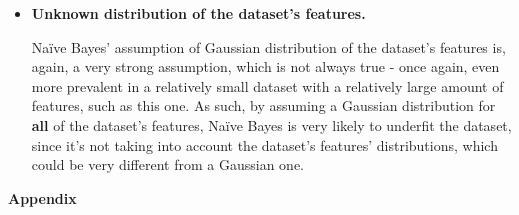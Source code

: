 \documentclass[12pt]{article}
\begin{document}
\begin{enumerate}[leftmargin=\labelsep,resume]
\begin{itemize}
    \item \textbf{Unknown distribution of the dataset's features.}
    
    Naïve Bayes' assumption of Gaussian distribution of the dataset's features
    is, again, a very strong assumption, which is not always true - once again,
    even more prevalent in a relatively small dataset with a relatively large
    amount of features, such as this one. As such, by assuming a Gaussian distribution
    for \textbf{all} of the dataset's features, Naïve Bayes is very likely to
    underfit the dataset, since it's not taking into account the dataset's
    features' distributions, which could be very different from a Gaussian one.
  \end{itemize}

\end{enumerate}

\pagebreak

\large{\textbf{Appendix}\vskip 0.3cm}


\end{document}
